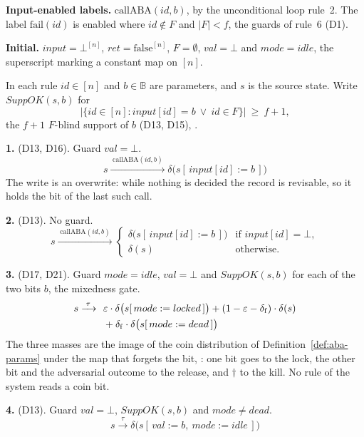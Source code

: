 \noindent\textbf{Input-enabled labels.}
$\mathrm{callABA}(id,b)$, by the unconditional loop rule~2.
The label $\mathrm{fail}(id)$ is enabled where $id \notin F$ and $|F| < f$, the guards of rule~6 (D1).

\noindent\textbf{Initial.}
$input = \bot^{[n]}$, $ret = \mathrm{false}^{[n]}$, $F = \emptyset$, $val = \bot$ and $mode = idle$, the superscript marking a constant map on $[n]$.

\medskip
\noindent In each rule $id \in [n]$ and $b \in \mathbb{B}$ are parameters, and $s$ is the source state.
Write $SuppOK(s,b)$ for
\[ \bigl|\{ id \in [n] : input[id] = b \ \vee\ id \in F \}\bigr| \ \geq\ f + 1 , \]
the $f{+}1$ $F$-blind support of $b$ (D13, D15), .

\medskip
\noindent\textbf{1.}  (D13, D16).
Guard $val = \bot$.
\[ s \xrightarrow{\;\mathrm{callABA}(id,b)\;}
   \delta\bigl(s[\,input[id] := b\,]\bigr) \]
The write is an overwrite: while nothing is decided the record is revisable, so it holds the bit of the last such call.

\noindent\textbf{2.}  (D13).
No guard.
\[ s \xrightarrow{\;\mathrm{callABA}(id,b)\;}
   \begin{cases}
     \delta\bigl(s[\,input[id] := b\,]\bigr) & \text{if } input[id] = \bot,\\
     \delta(s) & \text{otherwise.}
   \end{cases} \]

\noindent\textbf{3.}  (D17, D21).
Guard $mode = idle$, $val = \bot$ and $SuppOK(s,b)$ for each of the two bits $b$, the mixedness gate.
\[ \begin{aligned}
     s \xrightarrow{\;\tau\;}\ \
     &\varepsilon\cdot\delta\bigl(s[\,mode := locked\,]\bigr)
     + (1-\varepsilon-\delta_{\mathrm{f}})\cdot\delta(s)\\
     &{}+ \delta_{\mathrm{f}}\cdot\delta\bigl(s[\,mode := dead\,]\bigr)
   \end{aligned} \]
The three masses are the image of the coin distribution of Definition~\ref{def:aba-params} under the map that forgets the bit, : one bit goes to the lock, the other bit and the adversarial outcome to the release, and $\dagger$ to the kill.
No rule of the system reads a coin bit.

\noindent\textbf{4.}  (D13).
Guard $val = \bot$, $SuppOK(s,b)$ and $mode \neq dead$.
\[ s \xrightarrow{\;\tau\;}
   \delta\bigl(s[\,val := b,\ mode := idle\,]\bigr) \]

